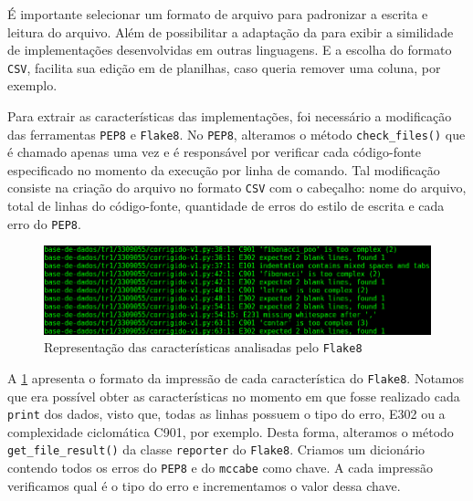 			É importante selecionar um formato de arquivo para padronizar a escrita
			e leitura do arquivo. Além de possibilitar a adaptação da 
			para exibir a similidade de implementações desenvolvidas em outras linguagens.
			E a escolha do formato \texttt{CSV}, facilita sua edição em 
			de planilhas, caso queria remover uma coluna, por exemplo.
			
			Para extrair as características das implementações, foi necessário a modificação
			das ferramentas \texttt{PEP8} e \texttt{Flake8}. No \texttt{PEP8}, alteramos o
			método \texttt{check\_files()} que é chamado apenas uma vez e é responsável por
			verificar cada código-fonte especificado no momento da execução por linha de
			comando. Tal modificação consiste na criação do arquivo no formato \texttt{CSV}
			com o cabeçalho: nome do arquivo, total de linhas do código-fonte, quantidade
			de erros do estilo de escrita e cada erro do \texttt{PEP8}.
			
			\begin{figure}[h]
				\centering
				\includegraphics[width=1\linewidth]{imagem/flake8}
				\caption{Representação das características analisadas pelo \texttt{Flake8}}
				\label{fig:flake8}
			\end{figure}
			
			A \cref{fig:flake8} apresenta o formato da impressão de cada característica do
			\texttt{Flake8}. Notamos que era possível obter as características no momento em
			que fosse realizado cada \texttt{print} dos dados, visto que, todas as linhas
			possuem o tipo do erro, E302 ou a complexidade ciclomática C901, por exemplo.
			Desta forma, alteramos o método \texttt{get\_file\_result()} da classe
			\texttt{reporter} do \texttt{Flake8}. Criamos um dicionário contendo todos os
			erros do \texttt{PEP8} e do \texttt{mccabe} como chave. A cada impressão
			verificamos qual é o tipo do erro e incrementamos o valor dessa chave.
			
